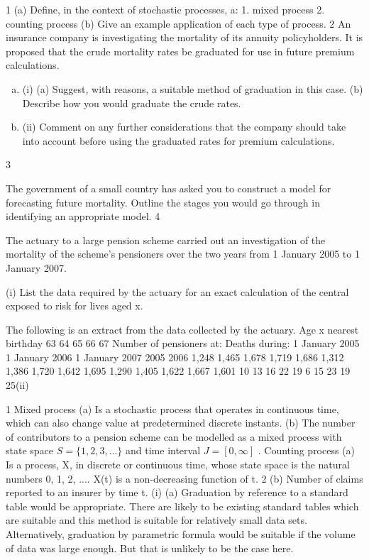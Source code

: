 \documentclass[a4paper,12pt]{article}
\begin{document}
\begin{enumerate}
1
(a)
Define, in the context of stochastic processes, a:
1. mixed process
2. counting process
(b)
Give an example application of each type of process.
2
An insurance company is investigating the mortality of its annuity policyholders. It is
proposed that the crude mortality rates be graduated for use in future premium
calculations.

\begin{enumerate}[(a)]
\item (i)
(a) Suggest, with reasons, a suitable method of graduation in this case.
(b) Describe how you would graduate the crude rates.
\item 
(ii)
Comment on any further considerations that the company should take into
account before using the graduated rates for premium calculations.
\end{enumerate}

3

The government of a small country has asked you to construct a model for forecasting
future mortality.
Outline the stages you would go through in identifying an appropriate model.
4

The actuary to a large pension scheme carried out an investigation of the mortality of
the scheme’s pensioners over the two years from 1 January 2005 to 1 January 2007.

(i)
List the data required by the actuary for an exact calculation of the central
exposed to risk for lives aged x.

The following is an extract from the data collected by the actuary.
Age x
nearest
birthday
63
64
65
66
67
Number of pensioners at:
Deaths during:
1 January
2005 1 January
2006 1 January
2007 2005 2006
1,248
1,465
1,678
1,719
1,686 1,312
1,386
1,720
1,642
1,695 1,290
1,405
1,622
1,667
1,601 10
13
16
22
19 6
15
23
19
25(ii)

1
Mixed process
(a) Is a stochastic process that operates in continuous time, which can also change
value at predetermined discrete instants.
(b) The number of contributors to a pension scheme can be modelled as a mixed
process with state space $S = \{ 1, 2,3,... \}$ and time interval $J = [ 0, \infty ]$ .
Counting process
(a)
Is a process, X, in discrete or continuous time, whose state space is the natural
numbers {0, 1, 2, ...}.
X(t) is a non-decreasing function of t.
2
(b) Number of claims reported to an insurer by time t.
(i) (a)
Graduation by reference to a standard table would be appropriate.
There are likely to be existing standard tables which are suitable and this method is suitable for relatively small data sets.
Alternatively, graduation by parametric formula would be suitable if the volume of data was large enough. But that is unlikely to be the
case here.


\end{enumerate}
\end{document}

